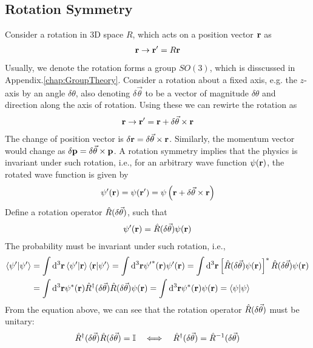 \subsection{Rotation Symmetry}
Consider a rotation in 3D space $R$, which acts on a position vector $\mathbf{r}$ as
\begin{align}
    \mathbf{r} \rightarrow \mathbf{r}' = R \mathbf{r}
\end{align}
Usually, we denote the rotation forms a group $SO(3)$, which is disscussed in Appendix.\ref{chap:GroupTheory}. Consider a rotation about a fixed axis, e.g. the $z$-axis by an angle $\delta \theta$, also denoting $\delta \vec{\theta}$ to be a vector of magnitude $\delta \theta$ and direction along the axis of rotation. Using these we can rewirte the rotation as 
\begin{align}
    \mathbf{r} \rightarrow \mathbf{r}' = \mathbf{r} + \delta \vec{\theta} \times \mathbf{r}
\end{align}
The change of position vector is $\delta \mathbf{r} = \delta \vec{\theta} \times \mathbf{r}$. Similarly, the momentum vector would change as $\delta \mathbf{p} = \delta \vec{\theta} \times \mathbf{p}$. A rotation symmetry implies that the physics is invariant under such rotation, i.e., for an arbitrary wave function $\psi(\mathbf{r})$, the rotated wave function is given by
\begin{align}
    \psi'(\mathbf{r}) = \psi (\mathbf{r}') = \psi \left(\mathbf{r}+ \delta \vec{\theta} \times \mathbf{r}\right)
\end{align}
Define a rotation operator $\hat{R}(\delta \vec{\theta})$, such that
\begin{align}
    \psi'(\mathbf{r}) = \hat{R}(\delta \vec{\theta}) \psi(\mathbf{r})
\end{align}
The probability must be invariant under such rotation, i.e.,
\begin{align}
    \braket{\psi'|\psi'} &= \int \mathrm{d}^3 \mathbf{r} \braket{\psi'|\mathbf{r}} \braket{\mathbf{r}|\psi'} = \int \mathrm{d}^3 \mathbf{r} {\psi'}^*(\mathbf{r}) \psi'(\mathbf{r}) = \int \mathrm{d}^3 \mathbf{r} \left[\hat{R}(\delta \vec{\theta}) \psi(\mathbf{r})\right]^* \hat{R}(\delta \vec{\theta}) \psi(\mathbf{r}) \\
    &= \int \mathrm{d}^3 \mathbf{r} \psi^*(\mathbf{r}) \hat{R}^ \dag(\delta \vec{\theta}) \hat{R}(\delta \vec{\theta}) \psi(\mathbf{r}) = \int \mathrm{d}^3 \mathbf{r} \psi^*(\mathbf{r}) \psi(\mathbf{r}) = \braket{\psi|\psi} 
\end{align}
From the equation above, we can see that the rotation operator $\hat{R}(\delta \vec{\theta})$ must be unitary: 
\begin{align}
    \hat{R}^ \dag(\delta \vec{\theta}) \hat{R}(\delta \vec{\theta}) = \mathbb{I} \quad \Longleftrightarrow \quad \hat{R}^ \dag (\delta \vec{\theta}) = \hat{R}^{-1}(\delta \vec{\theta})
\end{align}
